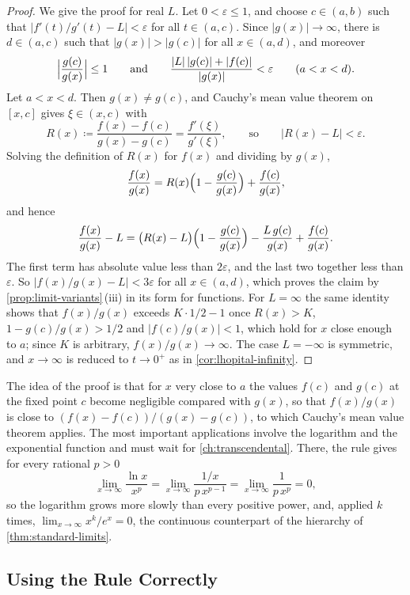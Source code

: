 \begin{proof}
We give the proof for real $L$. Let $0<\varepsilon\le1$, and choose $c\in(a,b)$ such that $|f'(t)/g'(t)-L|<\varepsilon$ for all $t\in(a,c)$. Since $|g(x)|\to\infty$, there is $d\in(a,c)$ such that $|g(x)|>|g(c)|$ for all $x\in(a,d)$, and moreover
\[
\Bigl|\frac{g(c)}{g(x)}\Bigr|\le1\qquad\text{and}\qquad\frac{|L|\,|g(c)|+|f(c)|}{|g(x)|}<\varepsilon\qquad(a<x<d).
\]
Let $a<x<d$. Then $g(x)\ne g(c)$, and Cauchy's mean value theorem on $[x,c]$ gives $\xi\in(x,c)$ with
\[
R(x)\coloneqq\frac{f(x)-f(c)}{g(x)-g(c)}=\frac{f'(\xi)}{g'(\xi)},\qquad\text{so}\qquad|R(x)-L|<\varepsilon .
\]
Solving the definition of $R(x)$ for $f(x)$ and dividing by $g(x)$,
\[
\frac{f(x)}{g(x)}=R(x)\Bigl(1-\frac{g(c)}{g(x)}\Bigr)+\frac{f(c)}{g(x)} ,
\]
and hence
\[
\frac{f(x)}{g(x)}-L=\bigl(R(x)-L\bigr)\Bigl(1-\frac{g(c)}{g(x)}\Bigr)-\frac{L\,g(c)}{g(x)}+\frac{f(c)}{g(x)} .
\]
The first term has absolute value less than $2\varepsilon$, and the last two together less than $\varepsilon$. So $|f(x)/g(x)-L|<3\varepsilon$ for all $x\in(a,d)$, which proves the claim by \cref{prop:limit-variants}\,(iii) in its form for functions. For $L=\infty$ the same identity shows that $f(x)/g(x)$ exceeds $K\cdot1/2-1$ once $R(x)>K$, $1-g(c)/g(x)>1/2$ and $|f(c)/g(x)|<1$, which hold for $x$ close enough to $a$; since $K$ is arbitrary, $f(x)/g(x)\to\infty$. The case $L=-\infty$ is symmetric, and $x\to\infty$ is reduced to $t\to0^+$ as in \cref{cor:lhopital-infinity}.
\end{proof}

The idea of the proof is that for $x$ very close to $a$ the values $f(c)$ and $g(c)$ at the fixed point $c$ become negligible compared with $g(x)$, so that $f(x)/g(x)$ is close to $(f(x)-f(c))/(g(x)-g(c))$, to which Cauchy's mean value theorem applies. The most important applications involve the logarithm and the exponential function and must wait for \cref{ch:transcendental}. There, the rule gives for every rational $p>0$
\[
\lim_{x\to\infty}\frac{\ln x}{x^p}=\lim_{x\to\infty}\frac{1/x}{p\,x^{p-1}}=\lim_{x\to\infty}\frac1{p\,x^p}=0 ,
\]
so the logarithm grows more slowly than every positive power, and, applied $k$ times, $\lim_{x\to\infty}x^k/e^x=0$, the continuous counterpart of the hierarchy of \cref{thm:standard-limits}.

\subsection{Using the Rule Correctly}

